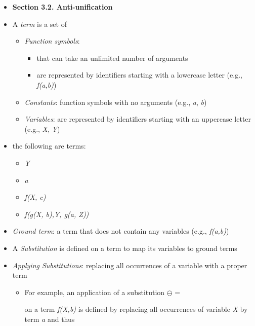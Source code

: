 \documentclass{article}
\newcommand{\bold}{\textbf}
\newcommand{\itt}{\textit}
\newcommand{\vars}{\textit}
\begin{document}
\begin{itemize} [leftmargin=.1in]
\item \bold{Section 3.2. Anti-unification}
\item  A \itt{term} is a set of
\begin{itemize} [leftmargin=.1in]
\item \itt{Function symbols}:
\begin{itemize} [leftmargin=.1in]
\item that can take an unlimited number of arguments
\item are represented by identifiers starting with a lowercase letter (e.g., \vars{f(a,b)})
\end{itemize}
\item \itt{Constants}: function symbols with no arguments (e.g., \vars{a}, \vars{b})
\item \itt{Variables}: are represented by identifiers starting with an uppercase letter (e.g., \vars{X}, \vars{Y})
\end{itemize}
\item the following are terms:
\begin{itemize}
\item \vars{Y}
\item \vars{a}
\item \vars{f(X, c)}
\item \vars{f(g(X, b),Y, g(a, Z))}
\end{itemize}

\item \itt{Ground term}: a term that does not contain any variables (e.g., \vars{f(a,b)})

\item A \itt{Substitution} is defined on a term to map its variables to ground terms
\item \itt{Applying Substitutions}: replacing all occurrences of a variable with a proper term
\begin{itemize}
\item For example, an application of a substitution $\ominus$ =
 on a term \vars{f(X,b)} is defined by replacing all occurrences of variable \vars{X} by term \vars{a} and thus
\end{itemize}


\end{itemize}
\end{document}
